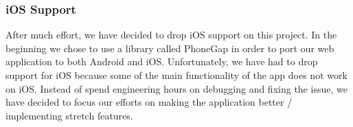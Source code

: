 \documentclass[11pt]{article}
\begin{document}
\subsubsection{iOS Support}

After much effort, we have decided to drop iOS support on this project. In the beginning we chose to use a library called PhoneGap in order to port our web application to both Android and iOS. Unfortunately, we have had to drop support for iOS because some of the main functionality of the app does not work on iOS. Instead of spend engineering hours on debugging and fixing the issue, we have decided to focus our efforts on making the application better / implementing stretch features.


\end{document}
